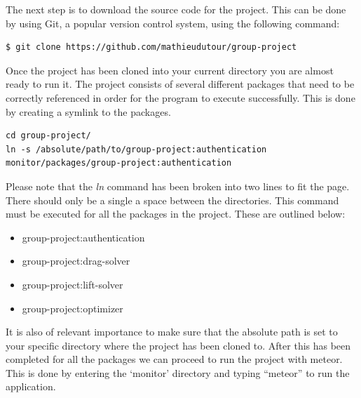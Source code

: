 \documentclass{article}
\begin{document}
\noindent The next step is to download the source code for the project. This can be done by using Git, a popular version control system, using the following command:

\vspace{5mm} %


\begin{verbatim}
$ git clone https://github.com/mathieudutour/group-project
\end{verbatim}


\vspace{5mm} %

\noindent Once the project has been cloned into your current directory you are almost ready to run it. The project consists of several different packages that need to be correctly referenced in order for the program to execute successfully. This is done by creating a symlink to the packages.

\vspace{5mm} %

\begin{verbatim}
cd group-project/
ln -s /absolute/path/to/group-project:authentication 
monitor/packages/group-project:authentication
\end{verbatim}




\vspace{5mm} %

\noindent Please note that the \textit{ln} command has been broken into two lines to fit the page. There should only be a single a space between the directories. This command must be executed for all the packages in the project. These are outlined below:

\begin{itemize}
  \item group-project:authentication
  \item group-project:drag-solver
  \item group-project:lift-solver
  \item group-project:optimizer
\end{itemize}

It is also of relevant importance to make sure that the absolute path is set to your specific directory where the project has been cloned to. After this has been completed for all the packages we can proceed to run the project with meteor. This is done by entering the `monitor' directory and typing ``meteor'' to run the application.
\end{document}
